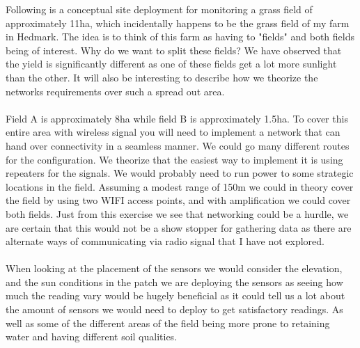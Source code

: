 \documentclass[]{uiophd}
\begin{document}
 Following is a conceptual site deployment for monitoring a grass field of approximately 11ha, which incidentally happens to be the grass field of my farm in Hedmark. The idea is to think of this farm as having to "fields" and both fields being of interest. Why do we want to split these fields? We have observed that the yield is significantly different as one of these fields get a lot more sunlight than the other. It will also be interesting to describe how we theorize the networks requirements over such a spread out area.
 \\\\
 Field A is approximately 8ha while field B is approximately 1.5ha. To cover this entire area with wireless signal you will need to implement a network that can hand over connectivity in a seamless manner. We could go many different routes for the configuration. We theorize that the easiest way to implement it is using repeaters for the signals. We would probably need to run power to some strategic locations in the field. Assuming a modest range of 150m we could in theory cover the field by using two WIFI access points, and with amplification we could cover both fields. Just from this exercise we see that networking could be a hurdle, we are certain that this would not be a show stopper for gathering data as there are alternate ways of communicating via radio signal that I have not explored.
 \\\\
 When looking at the placement of the sensors we would consider the elevation, and the sun conditions in the patch we are deploying the sensors as seeing how much the reading vary would be hugely beneficial as it could tell us a lot about the amount of sensors we would need to deploy to get satisfactory readings. As well as some of the different areas of the field being more prone to retaining water and having different soil qualities. 
 
\end{document}
